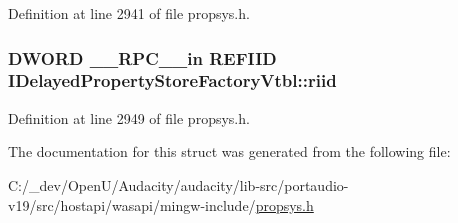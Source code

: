 Definition at line 2941 of file propsys.\+h.

\subsubsection[{\texorpdfstring{riid}{riid}}]{ {\bf D\+W\+O\+RD} {\bf \+\_\+\+\_\+\+R\+P\+C\+\_\+\+\_\+in} {\bf R\+E\+F\+I\+ID} I\+Delayed\+Property\+Store\+Factory\+Vtbl\+::riid}\hypertarget{struct_i_delayed_property_store_factory_vtbl_a330bed7d0bcdae8dca0afb6895b2e351}{}\label{struct_i_delayed_property_store_factory_vtbl_a330bed7d0bcdae8dca0afb6895b2e351}


Definition at line 2949 of file propsys.\+h.



The documentation for this struct was generated from the following file\+:\begin{DoxyCompactItemize}
\item 
C\+:/\+\_\+dev/\+Open\+U/\+Audacity/audacity/lib-\/src/portaudio-\/v19/src/hostapi/wasapi/mingw-\/include/\hyperlink{propsys_8h}{propsys.\+h}\end{DoxyCompactItemize}
